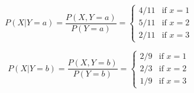 \[
P(X|Y=a) = \frac{P(X, Y=a)}{P(Y=a)} = 
    \begin{cases}
        4/11 & \text{if } x=1 \\
        5/11 & \text{if } x=2 \\
        2/11 & \text{if } x=3
    \end{cases}
\]

\[
P(X|Y=b) = \frac{P(X, Y=b)}{P(Y=b)} = 
    \begin{cases}
         2/9 & \text{if } x=1 \\
         2/3 & \text{if } x=2 \\
         1/9 & \text{if } x=3
    \end{cases}
\]